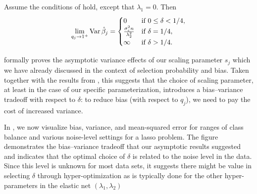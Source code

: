 \begin{corollary}
  \label{cor:ridge-variance}
  Assume the conditions of  hold, except that \(\lambda_1 = 0\). Then
  \[
    \lim_{q_j \rightarrow 1^+} \operatorname{Var} \hat{\beta}_j =
    \begin{cases}
      0                                          & \text{if } 0 \leq \delta < 1/4, \\
      \frac{\sigma_\varepsilon^2 n}{\lambda_2^2} & \text{if } \delta = 1/4,        \\
      \infty                                     & \text{if } \delta > 1/4.
    \end{cases}
  \]
\end{corollary}

 formally proves the asymptotic variance effects of our
scaling parameter \(s_j\) which we have already discussed in the context of selection
probability and bias. Taken together with the results from ,
this suggests that the choice of scaling parameter, at least in the case of our specific
parameterization, introduces a bias--variance tradeoff with respect to \(\delta\): to
reduce bias (with respect to \(q_j\)), we need to pay the cost of increased variance.

In , we now visualize bias, variance, and mean-squared
error for ranges of class balance and various noise-level settings for a lasso problem. The
figure demonstrates the bias--variance tradeoff that our asymptotic results suggested and
indicates that the optimal choice of \(\delta\) is related to the noise level in the data.
Since this level is unknown for most data sets, it suggests there might be value in
selecting \(\delta\) through hyper-optimization as is typically done for the other
hyper-parameters in the elastic net \((\lambda_1, \lambda_2)\)

